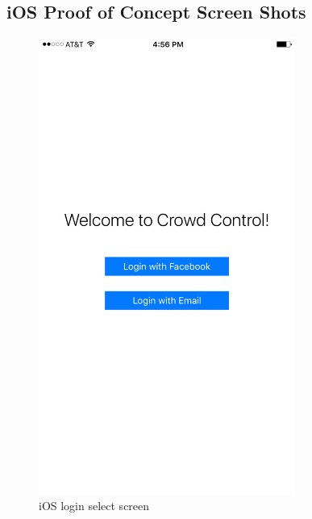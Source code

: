 \subsection{iOS Proof of Concept Screen Shots}


	\begin{figure}[tbh]
	\begin{center}
	\includegraphics[width=0.75\textwidth]{iOSPictures/img_3901.png}
	\end{center}
	\caption{iOS login select screen \label{iOSloginselectscreen}}
	\end{figure}

